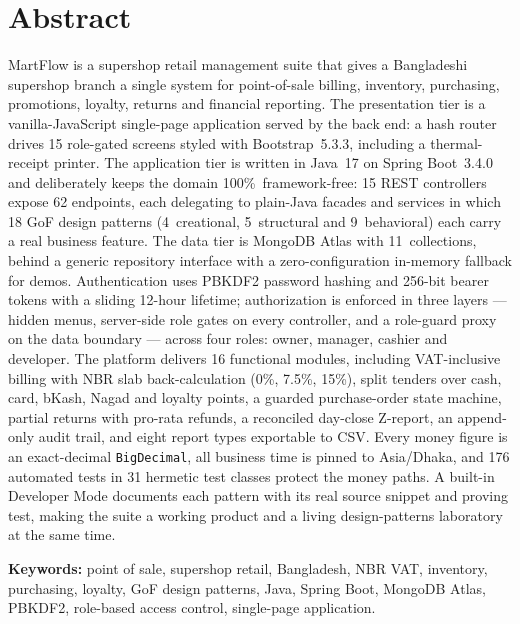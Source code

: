 \documentclass[12pt,a4paper]{report}
\begin{document}
\chapter*{Abstract}
\noindent
MartFlow is a supershop retail management suite that gives a Bangladeshi supershop branch a
single system for point-of-sale billing, inventory, purchasing, promotions, loyalty, returns
and financial reporting. The presentation tier is a vanilla-JavaScript single-page
application served by the back end: a hash router drives 15 role-gated screens styled with
Bootstrap~5.3.3, including a thermal-receipt printer. The application tier is written in
Java~17 on Spring Boot~3.4.0 and deliberately keeps the domain 100\%~framework-free: 15 REST
controllers expose 62 endpoints, each delegating to plain-Java facades and services in which
18 GoF design patterns (4~creational, 5~structural and 9~behavioral) each carry a real
business feature. The data tier is MongoDB Atlas with 11~collections, behind a generic
repository interface with a zero-configuration in-memory fallback for demos. Authentication
uses PBKDF2 password hashing and 256-bit bearer tokens with a sliding 12-hour lifetime;
authorization is enforced in three layers --- hidden menus, server-side role gates on every
controller, and a role-guard proxy on the data boundary --- across four roles: owner,
manager, cashier and developer. The platform delivers 16 functional modules, including
VAT-inclusive billing with NBR slab back-calculation (0\%, 7.5\%, 15\%), split tenders over
cash, card, bKash, Nagad and loyalty points, a guarded purchase-order state machine, partial
returns with pro-rata refunds, a reconciled day-close Z-report, an append-only audit trail,
and eight report types exportable to CSV. Every money figure is an exact-decimal
\texttt{BigDecimal}, all business time is pinned to Asia/Dhaka, and 176 automated tests in
31 hermetic test classes protect the money paths. A built-in Developer Mode documents each
pattern with its real source snippet and proving test, making the suite a working product
and a living design-patterns laboratory at the same time.

\vspace{1em}
\noindent\textbf{Keywords:} point of sale, supershop retail, Bangladesh, NBR VAT,
inventory, purchasing, loyalty, GoF design patterns, Java, Spring Boot, MongoDB Atlas,
PBKDF2, role-based access control, single-page application.

\end{document}
